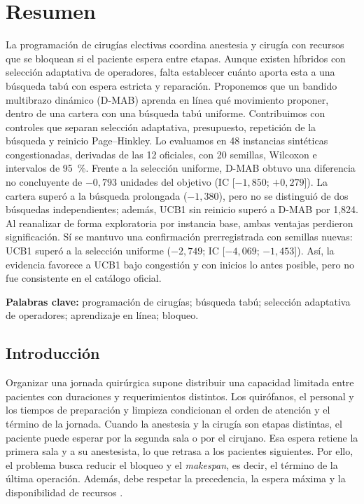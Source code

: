 \documentclass[12pt,letterpaper]{report}
\begin{document}
\hypersetup{pageanchor=false}

\hypersetup{pageanchor=true}

\chapter*{Resumen}
La programación de cirugías electivas coordina anestesia y cirugía con recursos
que se bloquean si el paciente espera entre etapas. Aunque existen híbridos con
selección adaptativa de operadores, falta establecer cuánto aporta esta a una
búsqueda tabú con espera estricta y reparación. Proponemos que un bandido
multibrazo dinámico (D-MAB) aprenda en línea qué movimiento proponer, dentro de una
cartera con una búsqueda tabú uniforme. Contribuimos con controles que separan
selección adaptativa, presupuesto, repetición de la búsqueda y reinicio
Page--Hinkley. Lo evaluamos en 48 instancias sintéticas congestionadas, derivadas de
las 12 oficiales, con 20 semillas, Wilcoxon e intervalos de 95~\%. Frente a la
selección uniforme, D-MAB obtuvo una diferencia no concluyente de $-0{,}793$
unidades del objetivo (IC [$-1{,}850$; $+0{,}279$]). La cartera superó a la
búsqueda prolongada ($-1{,}380$), pero no se distinguió de dos búsquedas independientes; además,
UCB1 sin reinicio superó a D-MAB por 1,824. Al reanalizar de forma exploratoria por instancia base,
ambas ventajas perdieron significación. Sí se mantuvo una confirmación
prerregistrada con semillas nuevas: UCB1 superó a la selección uniforme
($-2{,}749$; IC [$-4{,}069$; $-1{,}453$]). Así, la evidencia favorece a UCB1 bajo
congestión y con inicios lo antes posible, pero no fue consistente en el catálogo oficial.

\noindent\textbf{Palabras clave:} programación de cirugías; búsqueda tabú;
selección adaptativa de operadores; aprendizaje en línea; bloqueo.

\clearpage
\tableofcontents

\clearpage
\section{Introducción}
\label{sec:introduccion}\label{int-ini}
Organizar una jornada quirúrgica supone distribuir una capacidad limitada entre
pacientes con duraciones y requerimientos distintos. Los quirófanos, el personal
y los tiempos de preparación y limpieza condicionan el orden de atención y el
término de la jornada. Cuando la anestesia y la cirugía son etapas distintas, el
paciente puede esperar por la segunda sala o por el cirujano. Esa espera retiene
la primera sala y a su anestesista, lo que retrasa a los pacientes siguientes.
Por ello, el problema busca reducir el bloqueo y el \emph{makespan}, es decir, el
término de la última operación. Además, debe respetar la precedencia, la espera
máxima y la disponibilidad de recursos \parencite{lara2026}.
\end{document}

